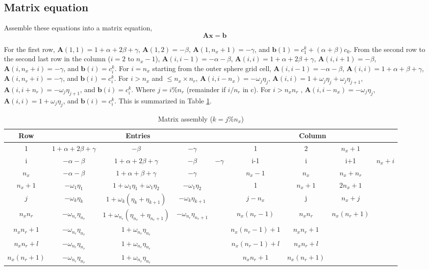 \documentclass{article}
\begin{document}
\subsection{Matrix equation}
Assemble these equations into a matrix equation,
\begin{equation}
\mathbf{A}\mathbf{x}=\mathbf{b}
\end{equation}

For the first row, $\mathbf{A}(1, 1) = 1 + \alpha + 2 \beta + \gamma$, $\mathbf{A}(1, 2) = -\beta$,  $\mathbf{A}(1, n_x+1) = -\gamma$, and $\mathbf{b}(1) = c_1^k + (\alpha+\beta)c_0$.   
From the second row to the second last row in the column ($i=2$ to $n_x-1$),  $\mathbf{A}(i, i-1) = -\alpha - \beta$, $\mathbf{A}(i, i) = 1 + \alpha + 2 \beta + \gamma$, $\mathbf{A}(i, i+1) = - \beta$,  $\mathbf{A}(i, n_x+i) = -\gamma$, and $\mathbf{b}(i) = c_i^k$. 
For $i = n_x$ starting from the outer sphere grid cell, $\mathbf{A}(i, i-1) = -\alpha - \beta$, $\mathbf{A}(i, i) = 1 + \alpha + \beta + \gamma$,  $\mathbf{A}(i, n_r+i) = -\gamma$, and $\mathbf{b}(i) = c_i^k$.
For $i >n_x$ and $\leq n_x\times n_r$, $\mathbf{A}(i, i-n_x) = -\omega_j \eta_j $, $\mathbf{A}(i, i) = 1 + \omega_j \eta_j + \omega_j \eta_{j+1} $,  $\mathbf{A}(i, i + n_r) = -\omega_j \eta_{j+1}$, and $\mathbf{b}(i) = c_i^k$. Where $j = i\%n_r$ (remainder if $i/n_r$ in c).
For $i >n_xn_r$ , $\mathbf{A}(i, i-n_x) = -\omega_j \eta_j $, $\mathbf{A}(i, i) = 1 + \omega_j \eta_j $,  and $\mathbf{b}(i) = c_i^k$. 
This is summarized in Table \ref{tab:assembly}.
\noindent
\begin{table}[H]
\label{tab:assembly}
\caption{Matrix assembly ($k=j\%n_x$)}
\begin{tabular}{ c | cccc | cccc }
\hline
Row & \multicolumn{4}{c|}{Entries} & \multicolumn{4}{c}{Column} \\
\hline
1 & $1+\alpha +2\beta+\gamma$      & $-\beta$ & $-\gamma$ & & 1 & 2 & $n_x+1$ & \\
i  & $-\alpha-\beta$ & $1+\alpha +2\beta+\gamma$      & $-\beta$ & $-\gamma$ & i-1 & i & i+1 & $n_x+i$ \\
$n_x$ & $-\alpha-\beta$ & $1+\alpha +\beta+\gamma$      & $-\gamma$ & & $n_x-1$ & $n_x$ & $n_x+n_r$ \\
\hline
$n_x+1$ & $-\omega_1\eta_1$ & $1+\omega_1\eta_1+\omega_1\eta_2$  & $-\omega_1\eta_2$    &   & 1 & $n_x+1$ & $2n_x+1$ &  \\
$j$ & $-\omega_k\eta_k$ & $1+\omega_k(\eta_k+\eta_{k+1})$  & $-\omega_k\eta_{k+1}$    &   & $j-n_x$ & j & $n_x+j$ &  \\
$n_xn_r$ & $-\omega_{n_r}\eta_{n_r}$ & $1+\omega_{n_r}(\eta_{n_r}+\eta_{n_r+1})$  & $-\omega_{n_r}\eta_{n_r+1}$    &   & $n_x(n_r-1)$ & $n_xn_r$ & $n_x(n_r+1)$ &  \\
\hline
$n_xn_r+1$ & $-\omega_{n_r}\eta_{n_r}$ & $1+\omega_{n_r}\eta_{n_r}$  &  &   & $n_x(n_r-1)+1$ & $n_xn_r+1$ & &  \\
$n_xn_r+l$ & $-\omega_{n_r}\eta_{n_r}$ & $1+\omega_{n_r}\eta_{n_r}$  &  &   & $n_x(n_r-1)+l$ & $n_xn_r+l$ & &  \\
$n_x(n_r+1)$ & $-\omega_{n_r}\eta_{n_r}$ & $1+\omega_{n_r}\eta_{n_r}$  &  &   & $n_xn_r+1$ & $n_x(n_r+1)$ &  &  \\
\hline
\end{tabular}
\end{table}
\end{document}
